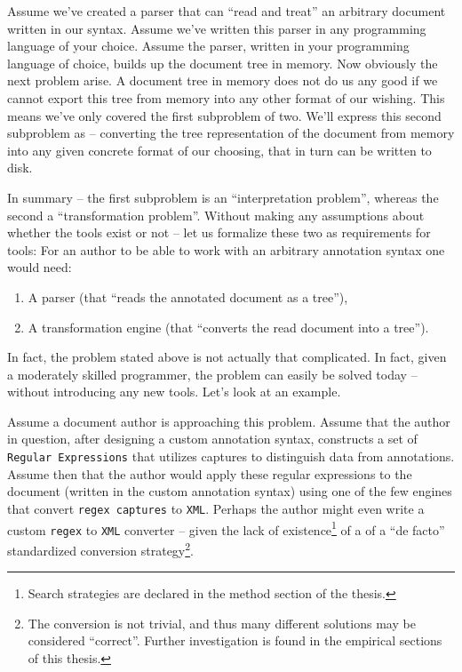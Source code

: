 \documentclass{scrreprt}
\begin{document}
Assume we've created a parser that can ``read and treat'' an arbitrary document written in our syntax. Assume we've written this parser in any programming language of your choice. Assume the parser, written in your programming language of choice, builds up the document tree in memory. Now obviously the next problem arise. A document tree in memory does not do us any good if we cannot export this tree from memory into any other format of our wishing. This means we've only covered the first subproblem of two. We'll express this second subproblem as -- converting the tree representation of the document from memory into any given concrete format of our choosing, that in turn can be written to disk.

In summary -- the first subproblem is an ``interpretation problem'', whereas the second a ``transformation problem''. Without making any assumptions about whether the tools exist or not -- let us formalize these two as requirements for tools: For an author to be able to work with an arbitrary annotation syntax one would need:

\begin{enumerate}
\item A parser (that ``reads the annotated document as a tree''),
\item A transformation engine (that ``converts the read document into a tree'').
\end{enumerate}

In fact, the problem stated above is not actually that complicated. In fact, given a moderately skilled programmer, the problem can easily be solved today -- without introducing any new tools. Let's look at an example.

Assume a document author is approaching this problem. Assume that the author in question, after designing a custom annotation syntax, constructs a set of \texttt{Regular Expressions} that utilizes captures to distinguish data from annotations. Assume then that the author would apply these regular expressions to the document (written in the custom annotation syntax)  using one of the few engines that convert \texttt{regex captures} to \texttt{XML}. Perhaps the author might even write a custom \texttt{regex} to \texttt{XML} converter -- given the lack of existence\footnote{ Search strategies are declared in the method section of the thesis.} of a of a ``de facto'' standardized conversion strategy\footnote{ The conversion is not trivial, and thus many different solutions may be considered ``correct''. Further investigation is found in the empirical sections of this thesis.}.
\end{document}
